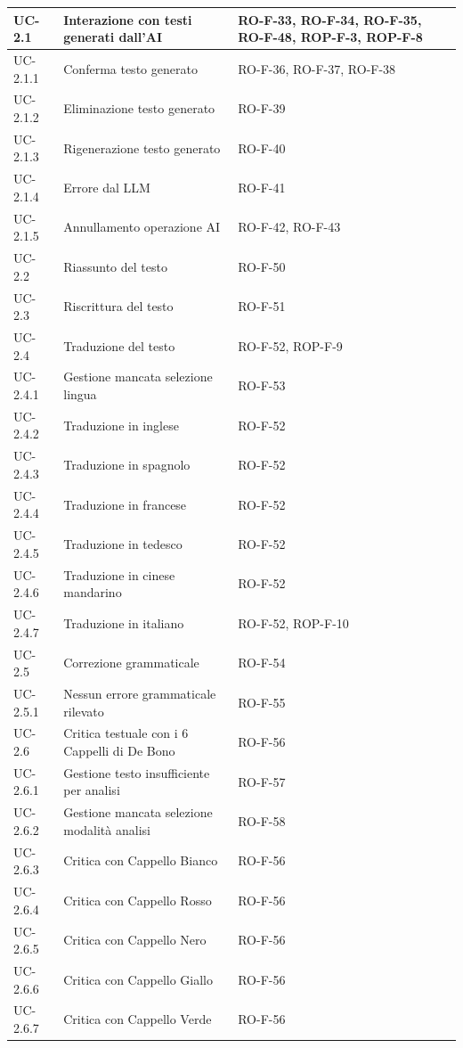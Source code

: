 \documentclass[11pt,a4paper]{article}
\begin{document}
\begin{longtable}{|p{}|p{}|>{\raggedright\arraybackslash}p{}|}
UC-2.1 & Interazione con testi generati dall'AI & RO-F-33, RO-F-34, RO-F-35, RO-F-48, ROP-F-3, ROP-F-8 \\
\hline
UC-2.1.1 & Conferma testo generato & RO-F-36, RO-F-37, RO-F-38 \\
\hline
UC-2.1.2 & Eliminazione testo generato & RO-F-39 \\
\hline
UC-2.1.3 & Rigenerazione testo generato & RO-F-40 \\
\hline
UC-2.1.4 & Errore dal LLM & RO-F-41 \\
\hline
UC-2.1.5 & Annullamento operazione AI & RO-F-42, RO-F-43 \\
\hline
UC-2.2 & Riassunto del testo & RO-F-50 \\
\hline
UC-2.3 & Riscrittura del testo & RO-F-51 \\
\hline
UC-2.4 & Traduzione del testo & RO-F-52, ROP-F-9 \\
\hline
UC-2.4.1 & Gestione mancata selezione lingua & RO-F-53 \\
\hline
UC-2.4.2 & Traduzione in inglese & RO-F-52 \\
\hline
UC-2.4.3 & Traduzione in spagnolo & RO-F-52 \\
\hline
UC-2.4.4 & Traduzione in francese & RO-F-52 \\
\hline
UC-2.4.5 & Traduzione in tedesco & RO-F-52 \\
\hline
UC-2.4.6 & Traduzione in cinese mandarino & RO-F-52 \\
\hline
UC-2.4.7 & Traduzione in italiano & RO-F-52, ROP-F-10 \\
\hline
UC-2.5 & Correzione grammaticale & RO-F-54 \\
\hline
UC-2.5.1 & Nessun errore grammaticale rilevato & RO-F-55 \\
\hline
UC-2.6 & Critica testuale con i 6 Cappelli di De Bono & RO-F-56 \\
\hline
UC-2.6.1 & Gestione testo insufficiente per analisi & RO-F-57 \\
\hline
UC-2.6.2 & Gestione mancata selezione modalità analisi & RO-F-58 \\
\hline
UC-2.6.3 & Critica con Cappello Bianco & RO-F-56 \\
\hline
UC-2.6.4 & Critica con Cappello Rosso & RO-F-56 \\
\hline
UC-2.6.5 & Critica con Cappello Nero & RO-F-56 \\
\hline
UC-2.6.6 & Critica con Cappello Giallo & RO-F-56 \\
\hline
UC-2.6.7 & Critica con Cappello Verde & RO-F-56 \\

\end{longtable}
\end{document}
